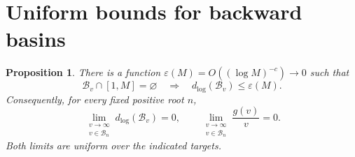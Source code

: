\documentclass[11pt,a4paper]{article}
\newtheorem{proposition}[theorem]{Proposition}
\begin{document}
\section{Uniform bounds for backward basins}

\begin{proposition}\label{prop:ct-basin-boundary}
There is a function \(\varepsilon(M)=O((\log M)^{-c})\to0\)
such that
\begin{equation}\label{eq:ct-small-ancestor}
 \mathcal B_v\cap[1,M]=\varnothing
       \quad\Longrightarrow\quad
 d_{\log}(\mathcal B_v)\le\varepsilon(M).
\end{equation}
Consequently, for every fixed positive root \(n\),
\begin{equation}\label{eq:ct-fixed-basin-boundary}
 \lim_{\substack{v\to\infty\\v\in\mathcal B_n}}
 d_{\log}(\mathcal B_v)=0,\qquad
 \lim_{\substack{v\to\infty\\v\in\mathcal B_n}}\frac{g(v)}v=0.
\end{equation}
Both limits are uniform over the indicated targets.
\end{proposition}
\end{document}
